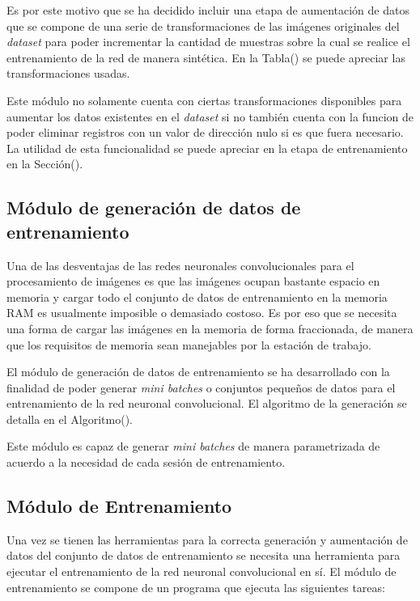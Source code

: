     Es por este motivo que se ha decidido incluir una etapa de aumentación de datos que se compone de una serie de transformaciones 
    de las imágenes originales del \textit{dataset} para poder incrementar la cantidad de muestras sobre la cual se realice el 
    entrenamiento de la red de manera sintética. En la Tabla() se puede apreciar las transformaciones usadas.
    

    Este módulo no solamente cuenta con ciertas transformaciones disponibles para aumentar los datos existentes en el \textit{dataset}
    si no también cuenta con la funcion de poder eliminar registros con un valor de dirección nulo si es que fuera necesario. La utilidad
    de esta funcionalidad se puede apreciar en la etapa de entrenamiento en la Sección().
    
    \subsection{Módulo de generación de datos de entrenamiento}

    Una de las desventajas de las redes neuronales convolucionales para el procesamiento de imágenes es que las imágenes 
    ocupan bastante espacio en memoria y cargar todo el conjunto de datos de entrenamiento en la memoria RAM es usualmente 
    imposible o demasiado costoso. Es por eso que se necesita una forma de cargar las imágenes en la memoria de forma 
    fraccionada, de manera que los requisitos de memoria sean manejables por la estación de trabajo. 

    El módulo de generación de datos de entrenamiento se ha desarrollado con la finalidad de poder generar \textit{mini batches} 
    o conjuntos pequeños de datos para el entrenamiento de la red neuronal convolucional. El algoritmo de la generación se 
    detalla en el Algoritmo().

    Este módulo es capaz de generar \textit{mini batches} de manera parametrizada de acuerdo a la necesidad de cada sesión de 
    entrenamiento.

    \subsection{Módulo de Entrenamiento}
    Una vez se tienen las herramientas para la correcta generación y aumentación de datos del conjunto de datos de entrenamiento 
    se necesita una herramienta para ejecutar el entrenamiento de la red neuronal convolucional en sí. El módulo de entrenamiento 
    se compone de un programa que ejecuta las siguientes tareas:


